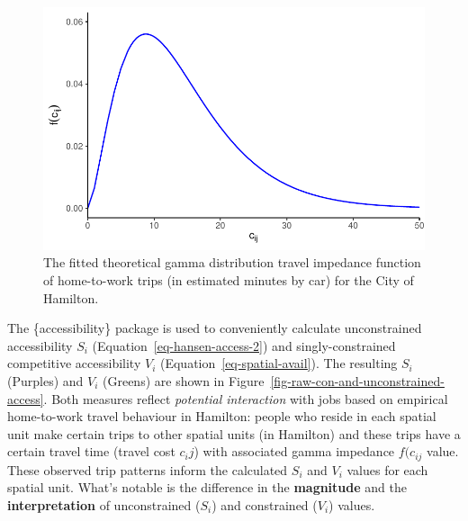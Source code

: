 \documentclass[12pt, oneside]{report}
\begin{document}
\begin{figure}

{\centering \includegraphics{tools-report_files/figure-pdf/fig-gamma-1.pdf}

}

\caption{\label{fig-gamma}The fitted theoretical gamma distribution
travel impedance function of home-to-work trips (in estimated minutes by
car) for the City of Hamilton.}

\end{figure}

The \{accessibility\} package is used to conveniently calculate
unconstrained accessibility \(S_i\) (Equation~\ref{eq-hansen-access-2})
and singly-constrained competitive accessibility \(V_i\)
(Equation~\ref{eq-spatial-avail}). The resulting \(S_i\) (Purples) and
\(V_i\) (Greens) are shown in
Figure~\ref{fig-raw-con-and-unconstrained-access}. Both measures reflect
\emph{potential interaction} with jobs based on empirical home-to-work
travel behaviour in Hamilton: people who reside in each spatial unit
make certain trips to other spatial units (in Hamilton) and these trips
have a certain travel time (travel cost \(c_ij\)) with associated gamma
impedance \(f(c_{ij}\) value. These observed trip patterns inform the
calculated \(S_i\) and \(V_i\) values for each spatial unit. What's
notable is the difference in the \textbf{magnitude} and the
\textbf{interpretation} of unconstrained (\(S_i\)) and constrained
(\(V_i\)) values.
\end{document}
